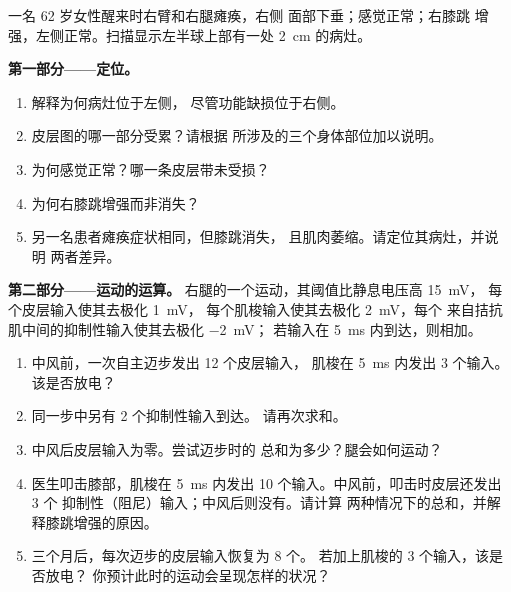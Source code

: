 \begin{problem}
\label{pb:g12:brain-and-movement:1}
一名 62 岁女性醒来时右臂和右腿瘫痪，右侧
面部下垂；感觉正常；右膝跳
增强，左侧正常。扫描显示左半球上部有一处
\qty{2}{cm} 的病灶。

\medskip
\noindent\textbf{第一部分——定位。}
\begin{enumerate}
  \item 解释为何病灶位于左侧，
        尽管功能缺损位于右侧。
  \item 皮层图的哪一部分受累？请根据
        所涉及的三个身体部位加以说明。
  \item 为何感觉正常？哪一条皮层带未受损？
  \item 为何右膝跳增强而非消失？
  \item 另一名患者瘫痪症状相同，但膝跳消失，
        且肌肉萎缩。请定位其病灶，并说明
        两者差异。
\end{enumerate}

\medskip
\noindent\textbf{第二部分——运动的运算。}
右腿的一个运动，其阈值比静息电压高 \qty{15}{mV}，
每个皮层输入使其去极化 \qty{1}{mV}，
每个肌梭输入使其去极化 \qty{2}{mV}，每个
来自拮抗肌中间的抑制性输入使其去极化 \qty{-2}{mV}；
若输入在 \qty{5}{ms} 内到达，则相加。
\begin{enumerate}[resume]
  \item 中风前，一次自主迈步发出 12 个皮层输入，
        肌梭在 \qty{5}{ms} 内发出 3 个输入。该是否放电？
  \item 同一步中另有 2 个抑制性输入到达。
        请再次求和。
  \item 中风后皮层输入为零。尝试迈步时的
        总和为多少？腿会如何运动？
  \item 医生叩击膝部，肌梭在
        \qty{5}{ms} 内发出 10 个输入。中风前，叩击时皮层还发出 3 个
        抑制性（阻尼）输入；中风后则没有。请计算
        两种情况下的总和，并解释膝跳增强的原因。
  \item 三个月后，每次迈步的皮层输入恢复为 8 个。
        若加上肌梭的 3 个输入，该是否放电？
        你预计此时的运动会呈现怎样的状况？
\end{enumerate}


\end{problem}
